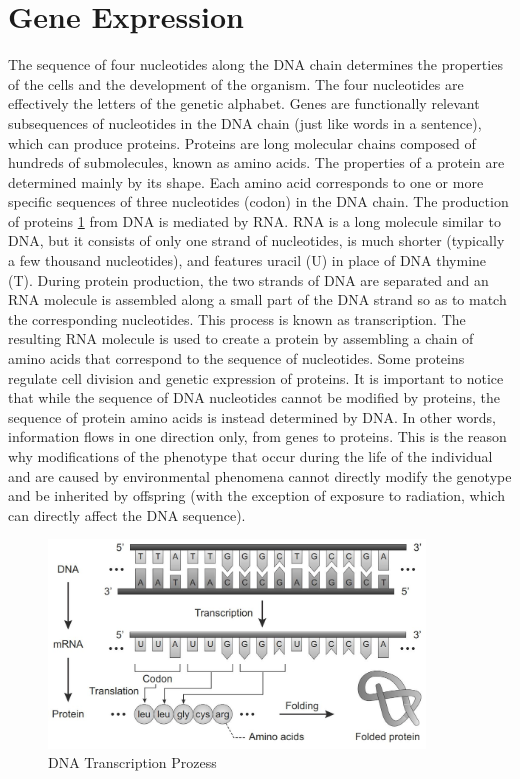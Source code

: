     \section{Gene Expression}
      The sequence of four nucleotides along the DNA chain determines the properties of the cells and the development of the organism. The four nucleotides are effectively the letters of the genetic alphabet.
      Genes are functionally relevant subsequences of nucleotides in the DNA chain (just like words in a sentence), which can produce proteins.
      Proteins are long molecular chains composed of hundreds of submolecules, known as amino acids.  The properties of a protein are determined mainly by its shape. Each amino acid corresponds to one or
      more specific sequences of three nucleotides (codon) in the DNA chain. The production of proteins \ref{pic:dnaTranscription} from DNA is mediated by RNA.
      RNA is a long molecule similar to DNA, but it consists of only one strand of nucleotides, is much shorter (typically a few thousand nucleotides), and features uracil (U) in place of DNA thymine (T).
      During protein production, the two strands of DNA are separated and an RNA molecule is assembled along a small part of the DNA strand so as to match the corresponding nucleotides.
      This process is known as transcription. The resulting RNA molecule is used to create a protein by assembling a chain of amino acids that correspond to the sequence of nucleotides.
      Some proteins regulate cell division and genetic expression of proteins. It is important to notice that while the sequence of DNA nucleotides cannot be modified by proteins, the sequence of protein amino
      acids is instead determined by DNA. In other words, information flows in one direction only, from genes to proteins. This is the reason why modifications of the phenotype that occur during the life of the individual and are
      caused by environmental phenomena cannot directly modify the genotype and be inherited by offspring (with the exception of exposure to radiation, which can directly affect the DNA sequence).
      \begin{figure}
        \centering
        \includegraphics[width=10cm]{graphics/DNA_Transcription_Protein}
        \caption[DNA Transcription]{DNA Transcription Prozess}
        \label{pic:dnaTranscription}
      \end{figure}
